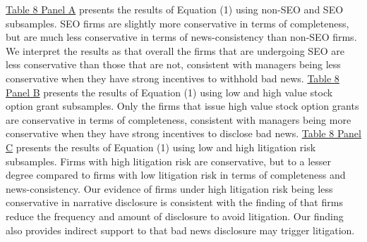 \documentclass[letterpaper,11pt]{article}
\begin{document}
\begin{spacing}{1.5}
\hyperref[T8]{Table 8 Panel A} presents the results of Equation (1) using non-SEO and SEO subsamples. SEO firms are slightly more conservative in terms of completeness, but are much less conservative in terms of news-consistency than non-SEO firms. We interpret the results as that overall the firms that are undergoing SEO are less conservative than those that are not, consistent with managers being less conservative when they have strong incentives to withhold bad news. \hyperref[T8]{Table 8 Panel B} presents the results of Equation (1) using low and high value stock option grant subsamples. Only the firms that issue high value stock option grants are conservative in terms of completeness, consistent with managers being more conservative when they have strong incentives to disclose bad news. \hyperref[T8]{Table 8 Panel C} presents the results of Equation (1) using low and high litigation risk subsamples. Firms with high litigation risk are conservative, but to a lesser degree compared to firms with low litigation risk in terms of completeness and news-consistency. Our evidence of firms under high litigation risk being less conservative in narrative disclosure is consistent with the finding of  that firms reduce the frequency and amount of disclosure to avoid litigation. Our finding also provides indirect support to  that bad news disclosure may trigger litigation.

\begin{comment}
\subsection{Bundling}
Using 8-K filings from 2005 to 2013, \citeA{segalAreManagersStrategic2016} find that managers strategically report negative news after trading hours when they believe that investor attention is low, and that firms bundle good and bad news disclosure to mitigate the negative impact of the latter. Consistent with \citeA{segalAreManagersStrategic2016}, \citeA{niessnerStrategicDisclosureTiming2015} find that managers systematically disclose bad news when investors are more distracted, and that this strategic disclosure of bad news is often accompanied with insider trading and earnings management. In sum, strategic delay or timing of bad news disclosure distorts the market and brings undesirable economic consequences.
\end{comment}


\end{spacing}
\end{document}
